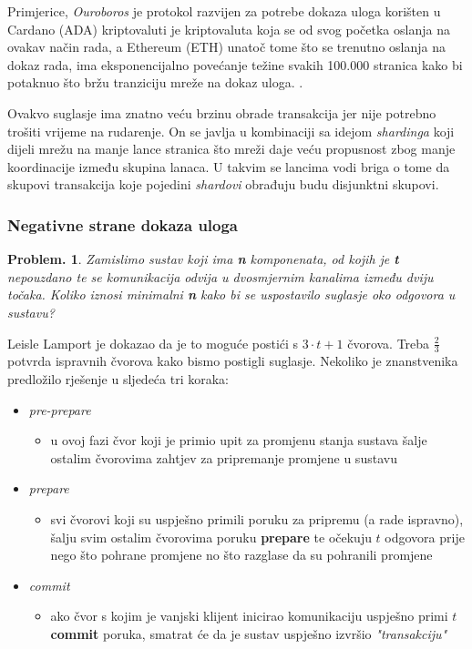 \documentclass[utf8, zavrsni]{fer}
\begin{document}
Primjerice, \textit{Ouroboros} \cite{ouroboros} je protokol razvijen za potrebe dokaza uloga korišten u Cardano (ADA) kriptovaluti je kriptovaluta koja se od svog početka oslanja na ovakav način rada, a Ethereum (ETH) unatoč tome što se trenutno oslanja na dokaz rada, ima eksponencijalno povećanje težine svakih 100.000 stranica kako bi potaknuo što bržu tranziciju mreže na dokaz uloga. \cite{wood2014ethereum}.

Ovakvo suglasje ima znatno veću brzinu obrade transakcija jer nije potrebno trošiti vrijeme na rudarenje. On se javlja u kombinaciji sa idejom \textit{shardinga} koji dijeli mrežu na manje lance stranica što mreži daje veću propusnost zbog manje koordinacije između skupina lanaca. U takvim se lancima vodi briga o tome da skupovi transakcija koje pojedini \textit{shardovi} obrađuju budu disjunktni skupovi.

\subsubsection{Negativne strane dokaza uloga}
\newtheorem{problem}{Problem.}
\begin{problem}
Zamislimo sustav koji ima \textbf{n} komponenata, od kojih je \textbf{t} nepouzdano te se komunikacija odvija u dvosmjernim kanalima između dviju točaka. Koliko iznosi minimalni \textbf{n} kako bi se uspostavilo suglasje oko odgovora u sustavu?
\end{problem}

Leisle Lamport \cite{lamport1982the} je dokazao da je to moguće postići s $3 \cdot t + 1$ čvorova. Treba $\frac{2}{3}$ potvrda ispravnih čvorova kako bismo postigli suglasje.
Nekoliko je znanstvenika predložilo rješenje u sljedeća tri koraka:
\begin{itemize}
    \item \textit{pre-prepare}
    \begin{itemize}
        \item u ovoj fazi čvor koji je primio upit za promjenu stanja sustava šalje ostalim čvorovima  zahtjev za pripremanje promjene u sustavu
    \end{itemize}
    \item \textit{prepare}
    \begin{itemize}
        \item svi čvorovi koji su uspješno primili poruku za pripremu (a rade ispravno), šalju svim ostalim čvorovima poruku \textbf{prepare} te očekuju $t$ odgovora prije nego što pohrane promjene no što razglase da su pohranili promjene
    \end{itemize}
    \item \textit{commit}
    \begin{itemize}
        \item ako čvor s kojim je vanjski klijent inicirao komunikaciju uspješno primi $t$ \textbf{commit} poruka, smatrat će da je sustav uspješno izvršio \textit{"transakciju"}
    \end{itemize}
\end{itemize}
\end{document}
